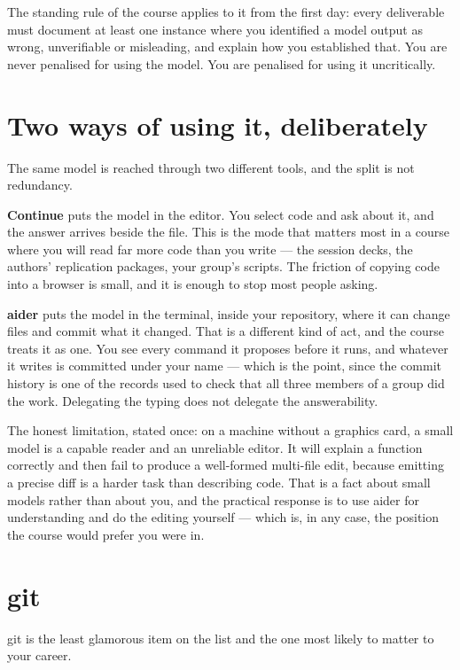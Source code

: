 \documentclass[
  letterpaper,
  10pt,
  twoside,
  openright,
  numbers=noenddot,
  chapterprefix=true]{scrbook}
\begin{document}
The standing rule of the course applies to it from the first day: every
deliverable must document at least one instance where you identified a
model output as wrong, unverifiable or misleading, and explain how you
established that. You are never penalised for using the model. You are
penalised for using it uncritically.

\section{Two ways of using it,
deliberately}\label{two-ways-of-using-it-deliberately}

The same model is reached through two different tools, and the split is
not redundancy.

\textbf{Continue} puts the model in the editor. You select code and ask
about it, and the answer arrives beside the file. This is the mode that
matters most in a course where you will read far more code than you
write --- the session decks, the authors' replication packages, your
group's scripts. The friction of copying code into a browser is small,
and it is enough to stop most people asking.

\textbf{aider} puts the model in the terminal, inside your repository,
where it can change files and commit what it changed. That is a
different kind of act, and the course treats it as one. You see every
command it proposes before it runs, and whatever it writes is committed
under your name --- which is the point, since the commit history is one
of the records used to check that all three members of a group did the
work. Delegating the typing does not delegate the answerability.

The honest limitation, stated once: on a machine without a graphics
card, a small model is a capable reader and an unreliable editor. It
will explain a function correctly and then fail to produce a well-formed
multi-file edit, because emitting a precise diff is a harder task than
describing code. That is a fact about small models rather than about
you, and the practical response is to use aider for understanding and do
the editing yourself --- which is, in any case, the position the course
would prefer you were in.

\section{git}\label{git}

git is the least glamorous item on the list and the one most likely to
matter to your career.
\end{document}
